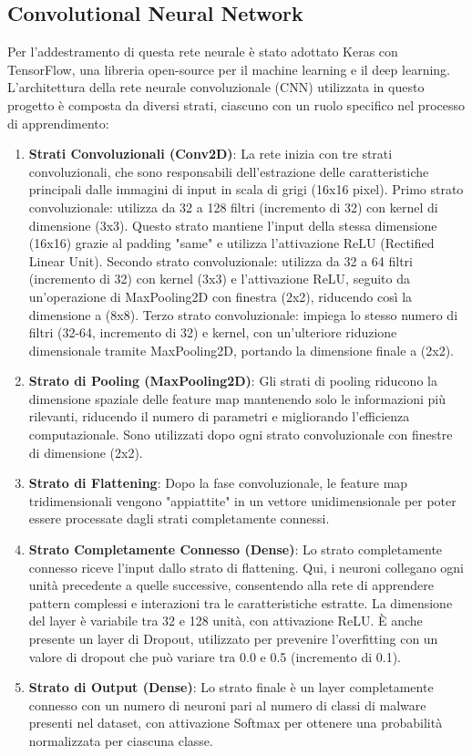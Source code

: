 \subsection{Convolutional Neural Network}
Per l'addestramento di questa rete neurale è stato adottato Keras\cite{site:keras} con TensorFlow\cite{site:tensorflow}, una libreria open-source per il machine learning e il deep learning.
L'architettura della rete neurale convoluzionale (CNN) utilizzata in questo progetto è composta da diversi strati, ciascuno con un ruolo specifico nel processo di apprendimento:
\begin{enumerate}
    \item \textbf{Strati Convoluzionali (Conv2D)}:
    La rete inizia con tre strati convoluzionali, che sono responsabili dell'estrazione delle caratteristiche principali dalle immagini di input in scala di grigi (16x16 pixel).
    Primo strato convoluzionale: utilizza da 32 a 128 filtri (incremento di 32) con kernel di dimensione (3x3). Questo strato mantiene l'input della stessa dimensione (16x16) grazie al padding "same" e utilizza l'attivazione ReLU (Rectified Linear Unit).
    Secondo strato convoluzionale: utilizza da 32 a 64 filtri (incremento di 32) con kernel (3x3) e l'attivazione ReLU, seguito da un'operazione di MaxPooling2D con finestra (2x2), riducendo così la dimensione a (8x8).
    Terzo strato convoluzionale: impiega lo stesso numero di filtri (32-64, incremento di 32) e kernel, con un'ulteriore riduzione dimensionale tramite MaxPooling2D, portando la dimensione finale a (2x2).
    \item \textbf{Strato di Pooling (MaxPooling2D)}:
    Gli strati di pooling riducono la dimensione spaziale delle feature map mantenendo solo le informazioni più rilevanti, riducendo il numero di parametri e migliorando l'efficienza computazionale.
    Sono utilizzati dopo ogni strato convoluzionale con finestre di dimensione (2x2).
    \item \textbf{Strato di Flattening}:
    Dopo la fase convoluzionale, le feature map tridimensionali vengono "appiattite" in un vettore unidimensionale per poter essere processate dagli strati completamente connessi.
    \item \textbf{Strato Completamente Connesso (Dense)}:
    Lo strato completamente connesso riceve l'input dallo strato di flattening. Qui, i neuroni collegano ogni unità precedente a quelle successive, consentendo alla rete di apprendere pattern complessi e interazioni tra le caratteristiche estratte.
    La dimensione del layer è variabile tra 32 e 128 unità, con attivazione ReLU. È anche presente un layer di Dropout, utilizzato per prevenire l'\gls{overfitting} con un valore di \gls{dropout} che può variare tra 0.0 e 0.5 (incremento di 0.1).
    \item \textbf{Strato di Output (Dense)}:
    Lo strato finale è un layer completamente connesso con un numero di neuroni pari al numero di classi di malware presenti nel dataset, con attivazione Softmax per ottenere una probabilità normalizzata per ciascuna classe.
\end{enumerate}

